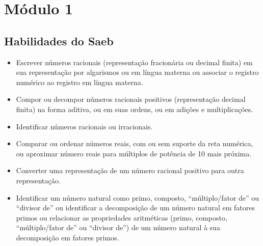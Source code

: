 
\chapter{Módulo 1}

\section{Habilidades do Saeb}

\begin{itemize}

\item 
  Escrever números racionais (representação fracionária ou decimal
  finita) em sua representação por algarismos ou em língua materna ou
  associar o registro numérico ao registro em língua materna.

\item 
  Compor ou decompor números racionais positivos (representação decimal
  finita) na forma aditiva, ou em suas ordens, ou em adições e
  multiplicações.

\item 
  Identificar números racionais ou irracionais.

\item 
  Comparar ou ordenar números reais, com ou sem suporte da reta
  numérica, ou aproximar número reais para múltiplos de potência de 10
  mais próxima.

\item 
  Converter uma representação de um número racional positivo para outra
  representação.

\item 
  Identificar um número natural como primo, composto, ``múltiplo/fator
  de'' ou ``divisor de'' ou identificar a decomposição de um número
  natural em fatores primos ou relacionar as propriedades aritméticas
  (primo, composto, ``múltiplo/fator de'' ou ``divisor de'') de um
  número natural à sua decomposição em fatores primos.
\end{itemize}


